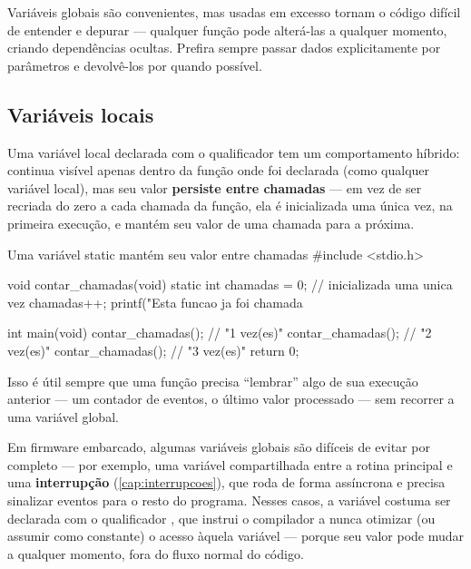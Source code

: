 \begin{atencao}
Variáveis globais são convenientes, mas usadas em excesso tornam o código difícil de entender e depurar — qualquer função pode alterá-las a qualquer momento, criando dependências ocultas. Prefira sempre passar dados explicitamente por parâmetros e devolvê-los por  quando possível.
\end{atencao}

\subsection{Variáveis locais }

Uma variável local declarada com o qualificador  tem um comportamento híbrido: continua visível apenas dentro da função onde foi declarada (como qualquer variável local), mas seu valor \textbf{persiste entre chamadas} — em vez de ser recriada do zero a cada chamada da função, ela é inicializada uma única vez, na primeira execução, e mantém seu valor de uma chamada para a próxima.

\begin{codigoc}{Uma variável static mantém seu valor entre chamadas}
#include <stdio.h>

void contar_chamadas(void) {
    static int chamadas = 0;   // inicializada uma unica vez
    chamadas++;
    printf("Esta funcao ja foi chamada %
}

int main(void) {
    contar_chamadas();   // "1 vez(es)"
    contar_chamadas();   // "2 vez(es)"
    contar_chamadas();   // "3 vez(es)"
    return 0;
}
\end{codigoc}

Isso é útil sempre que uma função precisa ``lembrar'' algo de sua execução anterior — um contador de eventos, o último valor processado — sem recorrer a uma variável global.

\begin{esp32box}
Em firmware embarcado, algumas variáveis globais são difíceis de evitar por completo — por exemplo, uma variável compartilhada entre a rotina principal e uma \textbf{interrupção} (\cref{cap:interrupcoes}), que roda de forma assíncrona e precisa sinalizar eventos para o resto do programa. Nesses casos, a variável costuma ser declarada com o qualificador , que instrui o compilador a nunca otimizar (ou assumir como constante) o acesso àquela variável — porque seu valor pode mudar a qualquer momento, fora do fluxo normal do código.
\end{esp32box}
